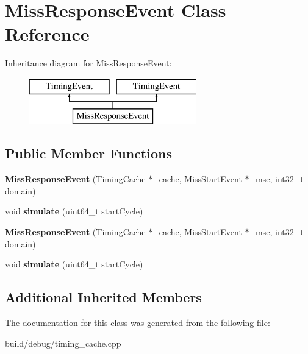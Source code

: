 \hypertarget{classMissResponseEvent}{\section{Miss\-Response\-Event Class Reference}
\label{classMissResponseEvent}
}
Inheritance diagram for Miss\-Response\-Event\-:\begin{figure}[H]
\begin{center}
\leavevmode
\includegraphics[height=2.000000cm]{classMissResponseEvent}
\end{center}
\end{figure}
\subsection*{Public Member Functions}
\begin{DoxyCompactItemize}
\item 
\hypertarget{classMissResponseEvent_a99eefb4dcfb6ba52fa99f4dcf3547d0a}{{\bfseries Miss\-Response\-Event} (\hyperlink{classTimingCache}{Timing\-Cache} $\ast$\-\_\-cache, \hyperlink{classMissStartEvent}{Miss\-Start\-Event} $\ast$\-\_\-mse, int32\-\_\-t domain)}\label{classMissResponseEvent_a99eefb4dcfb6ba52fa99f4dcf3547d0a}

\item 
\hypertarget{classMissResponseEvent_a2d5c1b98228a272d36d97e21a600a9fc}{void {\bfseries simulate} (uint64\-\_\-t start\-Cycle)}\label{classMissResponseEvent_a2d5c1b98228a272d36d97e21a600a9fc}

\item 
\hypertarget{classMissResponseEvent_a99eefb4dcfb6ba52fa99f4dcf3547d0a}{{\bfseries Miss\-Response\-Event} (\hyperlink{classTimingCache}{Timing\-Cache} $\ast$\-\_\-cache, \hyperlink{classMissStartEvent}{Miss\-Start\-Event} $\ast$\-\_\-mse, int32\-\_\-t domain)}\label{classMissResponseEvent_a99eefb4dcfb6ba52fa99f4dcf3547d0a}

\item 
\hypertarget{classMissResponseEvent_a2d5c1b98228a272d36d97e21a600a9fc}{void {\bfseries simulate} (uint64\-\_\-t start\-Cycle)}\label{classMissResponseEvent_a2d5c1b98228a272d36d97e21a600a9fc}

\end{DoxyCompactItemize}
\subsection*{Additional Inherited Members}


The documentation for this class was generated from the following file\-:\begin{DoxyCompactItemize}
\item 
build/debug/timing\-\_\-cache.\-cpp\end{DoxyCompactItemize}
